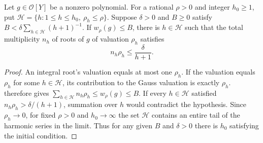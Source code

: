 \begin{lemma}
\label{lem:c-root-radius-count}
\emitthmsource
Let $g\in\mathcal O[Y]$ be a nonzero polynomial. For a rational $\rho>0$ and integer $h_0\ge1$, put $\mathcal H=\{h:1\le h\le h_0,\ \rho_h\le\rho\}$.
Suppose $\delta>0$ and $B\ge0$ satisfy $B<\delta\sum_{h\in\mathcal H}(h+1)^{-1}$.
If $w_\rho(g)\le B$, there is $h\in\mathcal H$ such that the total multiplicity $n_h$ of roots of $g$ of valuation $\rho_h$ satisfies
\[
 n_h\rho_h\le\frac{\delta}{h+1}.
\]
\end{lemma}
\begin{proof}
An integral root's valuation equals at most one $\rho_h$. If the valuation equals $\rho_h$ for some $h\in\mathcal H$, its contribution to the Gauss valuation is exactly $\rho_h$.
 therefore gives $\sum_{h\in\mathcal H}n_h\rho_h\le w_\rho(g)\le B$.
If every $h\in\mathcal H$ satisfied $n_h\rho_h>\delta/(h+1)$, summation over $h$ would contradict the hypothesis.
Since $\rho_h\to0$, for fixed $\rho>0$ and $h_0\to\infty$ the set $\mathcal H$ contains an entire tail of the harmonic series in the limit. Thus for any given $B$ and $\delta>0$ there is $h_0$ satisfying the initial condition.
\end{proof}

